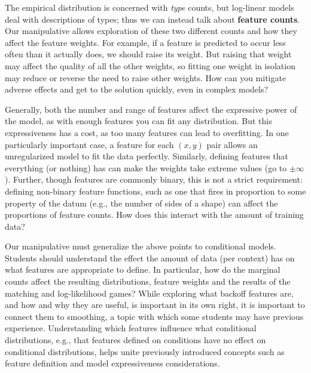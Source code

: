 \documentclass[11pt,letterpaper]{article}
\newcommand{\Data}[0]{\ensuremath{\mathcal{D}}}
\begin{document}
The empirical distribution is concerned with \textit{type} counts, but log-linear models 
deal with descriptions of types; thus we can instead talk about \textbf{feature counts}. Our 
manipulative allows exploration of these two different counts and how they affect the 
feature weights. For example, if a feature is predicted to occur less often than it actually does, 
we should raise its weight. But raising that weight 
may affect the quality of all the other weights, so fitting one weight in
isolation may reduce or reverse the need to raise other weights. How can you mitigate  
adverse effects and get to the solution quickly, even in complex models?

Generally, both the number and range of features affect the expressive 
power of the model, as with enough features you can fit any distribution. But this expressiveness 
has a cost, as too many features can lead to overfitting. 
In one particularly important case, a feature for each $(x,y)$ pair allows an unregularized model to fit the 
data perfectly. 
Similarly, defining features that everything (or nothing) has can make the weights 
take extreme values (go to $\pm \infty$). Further, though features are commonly binary, 
this is not a strict requirement: defining non-binary feature functions, such as one that fires in 
proportion to some property of the datum (e.g., the number of sides of a shape) can affect the
proportions of feature counts. How does this interact with the amount of training data?

Our manipulative must generalize the above points to conditional models. Students should 
understand the effect the amount of data (per context) has on what features are appropriate to define. 
In particular, how do the marginal counts affect the resulting distributions, feature 
weights and the results of the matching and log-likelihood games? 
While exploring what backoff features are, and how and why they are useful, is important in its own right, 
it is important to connect them to smoothing, a topic with which some students may have previous experience. 
Understanding which features influence 
what conditional distributions, e.g., that features defined on conditions have no effect on conditional distributions, 
helps unite previously introduced concepts such as feature definition and model expressiveness considerations.

\end{document}
